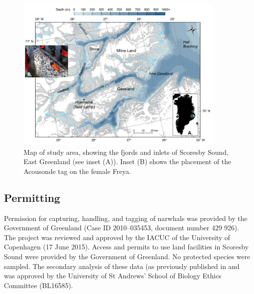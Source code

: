 \documentclass[preprint]{JASA}
\begin{document}
\begin{figure}[t]
\includegraphics[width=4in]{Figure1}%
\caption{\label{fig:FIG1}{Map of study area, showing the fjords and inlets of Scoresby Sound, East Greenland (see inset (A)). Inset (B) shows the placement of the Acousonde tag on the female Freya.}}%

\raggedright

\end{figure}

\subsection{\label{sec:2:2} Permitting}
Permission for capturing, handling, and tagging of narwhals was provided by the Government of Greenland (Case ID 2010–035453, document number 429 926). The project was reviewed and approved by the IACUC of the University of Copenhagen (17 June 2015). Access and permits to use land facilities in Scoresby Sound were provided by the Government of Greenland. No protected species were sampled. The secondary analysis of these data (as previously published in \citet{blackwell2018} and \citet{Tervo_2021} was approved by the University of St Andrews’ School of Biology Ethics Committee (BL16585).  
\end{document}

